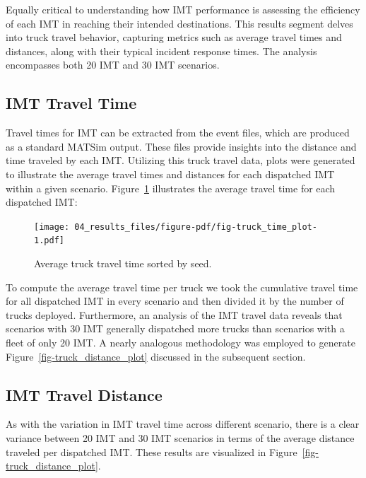 \documentclass[fancy, oneside, mastersfancy, ms]{byuthesis}
\begin{document}
Equally critical to understanding how IMT performance is assessing the
efficiency of each IMT in reaching their intended destinations. This
results segment delves into truck travel behavior, capturing metrics
such as average travel times and distances, along with their typical
incident response times. The analysis encompasses both 20 IMT and 30 IMT
scenarios.

\hypertarget{imt-travel-time}{%
\subsection{IMT Travel Time}\label{imt-travel-time}}

Travel times for IMT can be extracted from the event files, which are
produced as a standard MATSim output. These files provide insights into
the distance and time traveled by each IMT. Utilizing this truck travel
data, plots were generated to illustrate the average travel times and
distances for each dispatched IMT within a given scenario.
Figure~\ref{fig-truck_time_plot} illustrates the average travel time for
each dispatched IMT:

\begin{figure}

{\centering \texttt{[image: 04\_results\_files/figure-pdf/fig-truck\_time\_plot-1.pdf]}

}

\caption{\label{fig-truck_time_plot}Average truck travel time sorted by
seed.}

\end{figure}

To compute the average travel time per truck we took the cumulative
travel time for all dispatched IMT in every scenario and then divided it
by the number of trucks deployed. Furthermore, an analysis of the IMT
travel data reveals that scenarios with 30 IMT generally dispatched more
trucks than scenarios with a fleet of only 20 IMT. A nearly analogous
methodology was employed to generate
Figure~\ref{fig-truck_distance_plot} discussed in the subsequent
section.

\hypertarget{imt-travel-distance}{%
\subsection{IMT Travel Distance}\label{imt-travel-distance}}

As with the variation in IMT travel time across different scenario,
there is a clear variance between 20 IMT and 30 IMT scenarios in terms
of the average distance traveled per dispatched IMT. These results are
visualized in Figure~\ref{fig-truck_distance_plot}.
\end{document}
